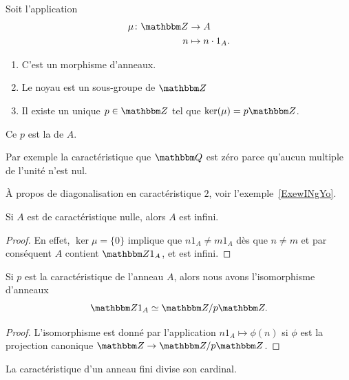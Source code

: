 \begin{lemmaDef}        \label{LEMDEFooVEWZooUrPaDw}
    Soit l'application
    \begin{equation}
        \begin{aligned}
            \mu\colon \eZ&\to A \\
            n&\mapsto n\cdot 1_A .
        \end{aligned}
    \end{equation}
    \begin{enumerate}
        \item
            C'est un morphisme d'anneaux.
        \item
            Le noyau est un sous-groupe de \( \eZ\)
        \item
            Il existe un unique \( p\in \eZ\) tel que \( \ker(\mu)=p\eZ\).
    \end{enumerate}
    Ce \( p\) est la  de \( A\).
\end{lemmaDef}

Par exemple la caractéristique que \( \eQ\) est zéro parce qu'aucun multiple de l'unité n'est nul.

À propos de diagonalisation en caractéristique \( 2\), voir l'exemple~\ref{ExewINgYo}.

\begin{lemma}
    Si \( A\) est de caractéristique nulle, alors \( A\) est infini.
\end{lemma}

\begin{proof}
    En effet, \( \ker\mu=\{0\} \) implique que \( n1_A \neq  m1_A\) dès que \(n \neq m \) et par conséquent \( A\) contient \(\eZ 1_A \), et  est infini.
\end{proof}

\begin{lemma}       \label{LemHmDaYH}
    Si \( p\) est la caractéristique de l'anneau \( A\), alors nous avons l'isomorphisme d'anneaux
    \begin{equation}
         \eZ 1_A\simeq\eZ/p\eZ.
    \end{equation}
\end{lemma}

\begin{proof}
    L'isomorphisme est donné par l'application \( n1_A\mapsto \phi(n)\) si \( \phi\) est la projection canonique \( \eZ\to \eZ/p\eZ\).
\end{proof}

\begin{proposition}     \label{PropGExaUK}
    La caractéristique d'un anneau fini divise son cardinal.
\end{proposition}

